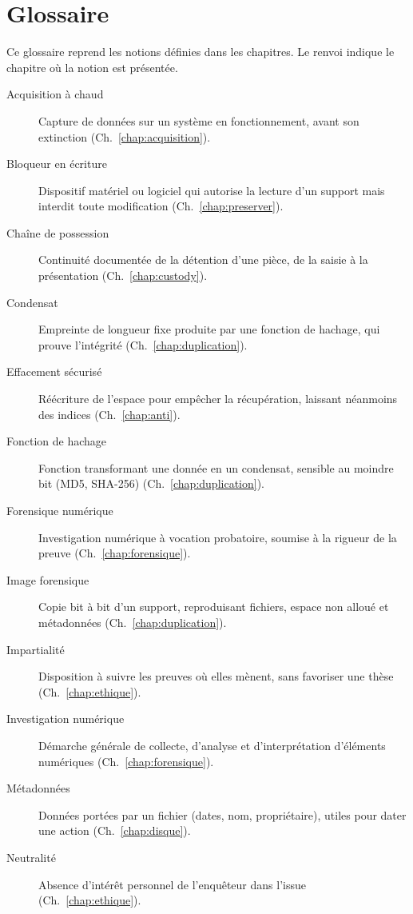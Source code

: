 \chapter{Glossaire}
\label{ann:glossaire}

Ce glossaire reprend les notions définies dans les chapitres. Le renvoi
indique le chapitre où la notion est présentée.

\begin{description}
    \item[Acquisition à chaud] Capture de données sur un système en fonctionnement, avant son extinction (Ch.~\ref{chap:acquisition}).
    \item[Bloqueur en écriture] Dispositif matériel ou logiciel qui autorise la lecture d'un support mais interdit toute modification (Ch.~\ref{chap:preserver}).
    \item[Chaîne de possession] Continuité documentée de la détention d'une pièce, de la saisie à la présentation (Ch.~\ref{chap:custody}).
    \item[Condensat] Empreinte de longueur fixe produite par une fonction de hachage, qui prouve l'intégrité (Ch.~\ref{chap:duplication}).
    \item[Effacement sécurisé] Réécriture de l'espace pour empêcher la récupération, laissant néanmoins des indices (Ch.~\ref{chap:anti}).
    \item[Fonction de hachage] Fonction transformant une donnée en un condensat, sensible au moindre bit (MD5, SHA-256) (Ch.~\ref{chap:duplication}).
    \item[Forensique numérique] Investigation numérique à vocation probatoire, soumise à la rigueur de la preuve (Ch.~\ref{chap:forensique}).
    \item[Image forensique] Copie bit à bit d'un support, reproduisant fichiers, espace non alloué et métadonnées (Ch.~\ref{chap:duplication}).
    \item[Impartialité] Disposition à suivre les preuves où elles mènent, sans favoriser une thèse (Ch.~\ref{chap:ethique}).
    \item[Investigation numérique] Démarche générale de collecte, d'analyse et d'interprétation d'éléments numériques (Ch.~\ref{chap:forensique}).
    \item[Métadonnées] Données portées par un fichier (dates, nom, propriétaire), utiles pour dater une action (Ch.~\ref{chap:disque}).
    \item[Neutralité] Absence d'intérêt personnel de l'enquêteur dans l'issue (Ch.~\ref{chap:ethique}).

\end{description}
